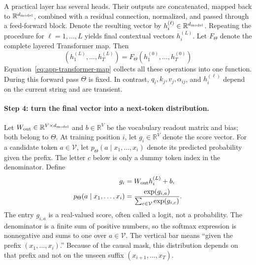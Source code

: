 \documentclass[
  aps,
  reprint,
  superscriptaddress,
  floatfix,
  nofootinbib,
  longbibliography
]{revtex4-2}
\newcommand{\R}{\mathbb{R}}
\begin{document}
A practical layer has several heads.  Their outputs are concatenated, mapped
back to $\R^{d_{\rm model}}$, combined with a residual connection, normalized,
and passed through a feed-forward block.  Denote the resulting vector by
$h_i^{(\ell)}\in\R^{d_{\rm model}}$.  Repeating the procedure for
$\ell=1,\ldots,L$ yields final contextual vectors $h_i^{(L)}$.  Let $F_\Theta$
denote the complete layered Transformer map.  Then
\begin{equation}
\label{eq:app-transformer-map}
(h_1^{(L)},\ldots,h_T^{(L)})
=F_\Theta(h_1^{(0)},\ldots,h_T^{(0)})
\end{equation}
Equation~\eqref{eq:app-transformer-map} collects all these operations into one
function.  During this forward pass
$\Theta$ is fixed.  In contrast, $q_i,k_j,v_j,\alpha_{ij}$, and
$h_i^{(\ell)}$ depend on the current string and are transient.

\paragraph{Step 4: turn the final vector into a next-token distribution.}
Let $W_{\rm out}\in\R^{V\times d_{\rm model}}$ and $b\in\R^V$ be the
vocabulary readout matrix and bias; both belong to $\Theta$.  At training
position $i$, let $g_i\in\R^V$ denote the score vector.  For a candidate token
$a\in\mathcal V$, let $p_\Theta(a\mid x_1,\ldots,x_i)$ denote its predicted
probability given the prefix.  The letter $c$ below is only a dummy token index
in the denominator.  Define
\begin{equation}
\label{eq:app-training-softmax}
\begin{aligned}
g_i&=W_{\rm out}h_i^{(L)}+b,\\
p_\Theta(a\mid x_1,\ldots,x_i)
&=\frac{\exp(g_{i,a})}
{\sum_{c\in\mathcal V}\exp(g_{i,c})}.
\end{aligned}
\end{equation}
The entry $g_{i,a}$ is a real-valued score, often called a logit, not a
probability.  The denominator is a finite sum of positive numbers, so the
softmax expression is nonnegative and
sums to one over $a\in\mathcal V$.  The vertical bar means ``given the prefix
$(x_1,\ldots,x_i)$.''  Because of the causal mask, this distribution depends on
that prefix and not on the unseen suffix $(x_{i+1},\ldots,x_T)$.
\end{document}
